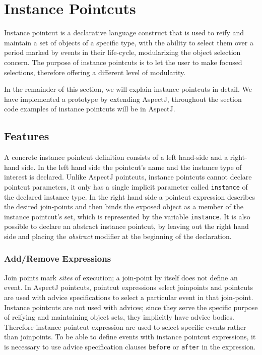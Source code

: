 \documentclass{llncs}
\begin{document}
\section{Instance Pointcuts}

Instance pointcut is a declarative language construct that is used to reify and maintain a set of objects of a specific type, with the ability to select them over a period marked by events in their life-cycle, modularizing the object selection concern. The purpose of instance pointcuts is to  let the user to make focused selections, therefore offering a different level of modularity. 
 
In the remainder of this section, we will explain instance pointcuts in detail. We have implemented a prototype by extending AspectJ, throughout the section code examples of instance pointcuts will be in AspectJ.


\subsection{Features}

A concrete instance pointcut definition consists of a left hand-side and a right-hand side. 
In the left hand side the pointcut's name and the instance type of interest is declared. 
Unlike AspectJ pointcuts, instance pointcuts cannot declare pointcut parameters, it only has a single implicit parameter called \texttt{instance} of the declared instance type. 
In the right hand side a pointcut expression describes the desired join-points and then binds the exposed object as a member of the instance pointcut's set, which is represented by the variable \texttt{instance}. 
It is also possible to declare an abstract instance pointcut, by leaving out the right hand side and placing the \emph{abstract} modifier at the beginning of the declaration.


\subsubsection{Add/Remove Expressions}
Join points mark \emph{sites} of execution; a join-point by itself does not define an event. 
In AspectJ pointcuts, pointcut expressions select joinpoints and pointcuts are used with advice specifications to select a particular event in that join-point.
Instance pointcuts are not used with advices; since they serve the specific purpose of reifying and maintaining object sets, they implicitly have advice bodies. 
Therefore instance pointcut expression are used to select specific events rather than joinpoints.
To be able to define events with instance pointcut expressions, it is necessary to use advice specification clauses \texttt{before} or \texttt{after} in the expression. 
\end{document}
